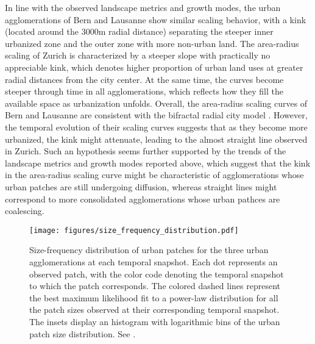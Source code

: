 \documentclass[10pt,letterpaper]{article}
\begin{document}
In line with the observed landscape metrics and growth modes, the urban agglomerations of Bern and Lausanne show similar scaling behavior, with a kink (located around the 3000m radial distance) separating the steeper inner urbanized zone and the outer zone with more non-urban land.
The area-radius scaling of Zurich is characterized by a steeper slope with practically no appreciable kink, which denotes higher proportion of urban land uses at greater radial distances from the city center.
At the same time, the curves become steeper through time in all agglomerations, which reflects how they fill the available space as urbanization unfolds.
Overall, the area-radius scaling curves of Bern and Lausanne are consistent with the bifractal radial city model \cite{white1993cellular,white2015modeling}. %
However, the temporal evolution of their scaling curves suggests that as they become more urbanized, the kink might attenuate, leading to the almost straight line observed in Zurich. %
Such an hypothesis seems further supported by the trends of the landscape metrics and growth modes reported above, which suggest that the kink in the area-radius scaling curve might be characteristic of agglomerations whose urban patches are still undergoing diffusion, whereas straight lines might correspond to more consolidated agglomerations whose urban pathces are coalescing.


\begin{figure}[!ht]
  \begin{adjustwidth}{-.4\textwidth}{0cm}
    \centering
    \texttt{[image: figures/size\_frequency\_distribution.pdf]}
    \vspace{.5em}
    \caption[Size-frequency distribution of urban patches]{\label{figures/size_frequency_distribution.pdf}Size-frequency distribution of urban patches for the three urban agglomerations at each temporal snapshot. Each dot represents an observed patch, with the color code denoting the temporal snapshot to which the patch corresponds. The colored dashed lines represent the best maximum likelihood fit to a power-law distribution for all the patch sizes observed at their corresponding temporal snapshot. The insets display an histogram with logarithmic bins of the urban patch size distribution. See .}
  \end{adjustwidth}
\end{figure}
\end{document}
